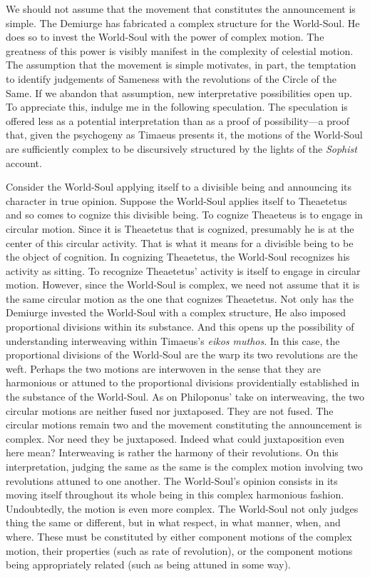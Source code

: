 We should not assume that the movement that constitutes the announcement is simple. The Demiurge has fabricated a complex structure for the World-Soul. He does so to invest the World-Soul with the power of complex motion. The greatness of this power is visibly manifest in the complexity of celestial motion. The assumption that the movement is simple motivates, in part, the temptation to identify judgements of Sameness with the revolutions of the Circle of the Same. If we abandon that assumption, new interpretative possibilities open up. To appreciate this, indulge me in the following speculation. The speculation is offered less as a potential interpretation than as a proof of possibility---a proof that, given the psychogeny as Timaeus presents it, the motions of the World-Soul are sufficiently complex to be discursively structured by the lights of the \emph{Sophist} account.

Consider the World-Soul applying itself to a divisible being and announcing its character in true opinion. Suppose the World-Soul applies itself to Theaetetus and so comes to cognize this divisible being. To cognize Theaeteus is to engage in circular motion. Since it is Theaetetus that is cognized, presumably he is at the center of this circular activity. That is what it means for a divisible being to be the object of cognition. In cognizing Theaetetus, the World-Soul recognizes his activity as sitting. To recognize Theaetetus' activity is itself to engage in circular motion. However, since the World-Soul is complex, we need not assume that it is the same circular motion as the one that cognizes Theaetetus. Not only has the Demiurge invested the World-Soul with a complex structure, He also imposed proportional divisions within its substance. And this opens up the possibility of understanding interweaving within Timaeus's \emph{eikos muthos}. In this case, the proportional divisions of the World-Soul are the warp its two revolutions are the weft. Perhaps the two motions are interwoven in the sense that they are harmonious or attuned to the proportional divisions providentially established in the substance of the World-Soul. As on Philoponus' take on interweaving, the two circular motions are neither fused nor juxtaposed. They are not fused. The circular motions remain two and the movement constituting the announcement is complex. Nor need they be juxtaposed. Indeed what could juxtaposition even here mean? Interweaving is rather the harmony of their revolutions. On this interpretation, judging the same as the same is the complex motion involving two revolutions attuned to one another. The World-Soul's opinion consists in its moving itself throughout its whole being in this complex harmonious fashion. Undoubtedly, the motion is even more complex. The World-Soul not only judges thing the same or different, but in what respect, in what manner, when, and where. These must be constituted by either component motions of the complex motion, their properties (such as rate of revolution), or the component motions being appropriately related (such as being attuned in some way).

